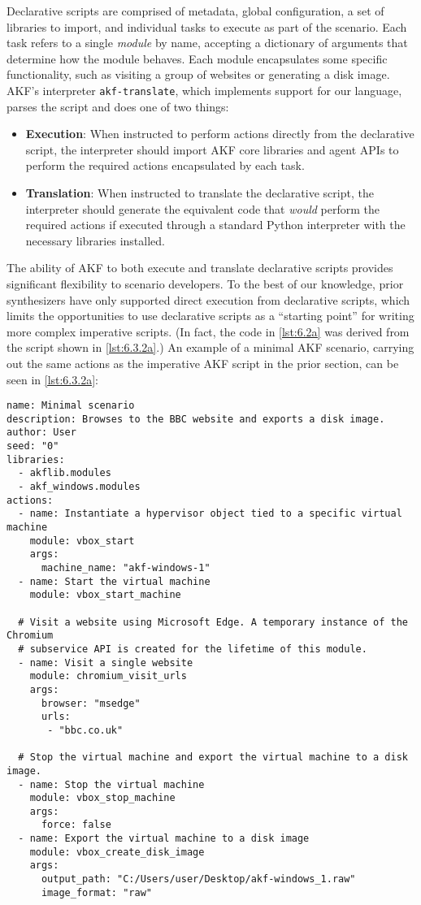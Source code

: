 \documentclass[preprint,12pt]{elsarticle}
\newcommand{\passthrough}[1]{#1}
\begin{document}
Declarative scripts are comprised of metadata, global configuration, a
set of libraries to import, and individual tasks to execute as part of
the scenario. Each task refers to a single \emph{module} by name,
accepting a dictionary of arguments that determine how the module
behaves. Each module encapsulates some specific functionality, such as
visiting a group of websites or generating a disk image. AKF's
interpreter \passthrough{\lstinline!akf-translate!}, which implements
support for our language, parses the script and does one of two things:

\begin{itemize}
\item
  \textbf{Execution}: When instructed to perform actions directly from
  the declarative script, the interpreter should import AKF core
  libraries and agent APIs to perform the required actions encapsulated
  by each task.
\item
  \textbf{Translation}: When instructed to translate the declarative
  script, the interpreter should generate the equivalent code that
  \emph{would} perform the required actions if executed through a
  standard Python interpreter with the necessary libraries installed.
\end{itemize}

The ability of AKF to both execute and translate declarative scripts
provides significant flexibility to scenario developers. To the best of
our knowledge, prior synthesizers have only supported direct execution
from declarative scripts, which limits the opportunities to use
declarative scripts as a ``starting point'' for writing more complex
imperative scripts. (In fact, the code in \autoref{lst:6.2a} was derived
from the script shown in \autoref{lst:6.3.2a}.) An example of a minimal
AKF scenario, carrying out the same actions as the imperative AKF script
in the prior section, can be seen in \autoref{lst:6.3.2a}:

\begin{lstlisting}[label={lst:6.3.2a}, caption={Example of a declarative AKF scenario.}, ]
name: Minimal scenario
description: Browses to the BBC website and exports a disk image.
author: User
seed: "0"
libraries:
  - akflib.modules
  - akf_windows.modules
actions:
  - name: Instantiate a hypervisor object tied to a specific virtual machine
    module: vbox_start
    args:
      machine_name: "akf-windows-1"
  - name: Start the virtual machine
    module: vbox_start_machine

  # Visit a website using Microsoft Edge. A temporary instance of the Chromium
  # subservice API is created for the lifetime of this module.
  - name: Visit a single website
    module: chromium_visit_urls
    args:
      browser: "msedge"
      urls: 
       - "bbc.co.uk"

  # Stop the virtual machine and export the virtual machine to a disk image.
  - name: Stop the virtual machine
    module: vbox_stop_machine
    args:
      force: false
  - name: Export the virtual machine to a disk image
    module: vbox_create_disk_image
    args:
      output_path: "C:/Users/user/Desktop/akf-windows_1.raw"
      image_format: "raw"
\end{lstlisting}
\end{document}
